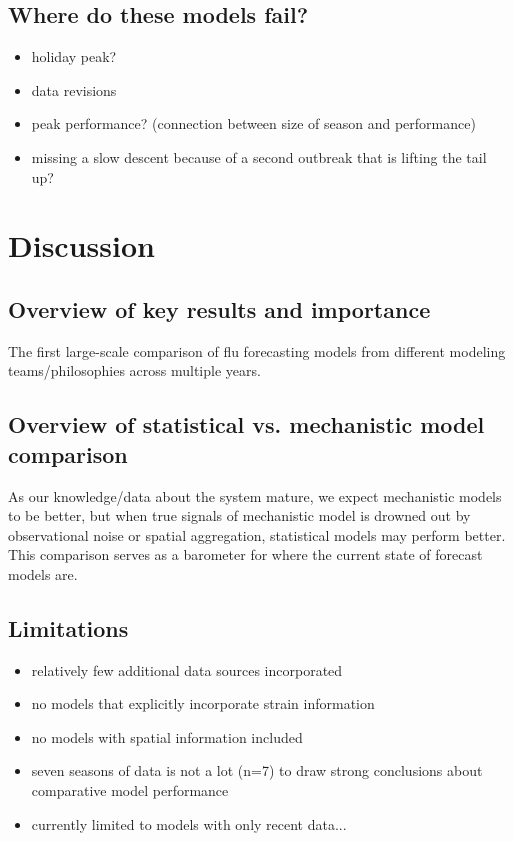 \documentclass{article}\usepackage[]{graphicx}\usepackage[]{color}
\begin{document}
\subsection{Where do these models fail?}

\begin{itemize}
    \item holiday peak?
    \item data revisions
    \item peak performance? (connection between size of season and performance)
    \item missing a slow descent because of a second outbreak that is lifting the tail up?
\end{itemize}


\section{Discussion}

\subsection{Overview of key results and importance}
The first large-scale comparison of flu forecasting models from different modeling teams/philosophies across multiple years.

\subsection{Overview of statistical vs. mechanistic model comparison}
As our knowledge/data about the system mature, we expect mechanistic models to be better, but when true signals of mechanistic model is drowned out by observational noise or spatial aggregation, statistical models may perform better. This comparison serves as a barometer for where the current state of forecast models are.

\subsection{Limitations}

\begin{itemize}
    \item relatively few additional data sources incorporated
    \item no models that explicitly incorporate strain information
    \item no models with spatial information included
    \item seven seasons of data is not a lot (n=7) to draw strong conclusions about comparative model performance
    \item currently limited to models with only recent data...
\end{itemize}



\end{document}
